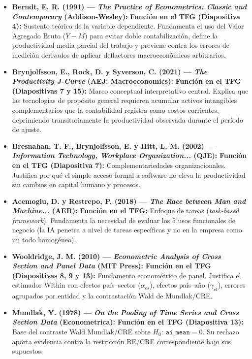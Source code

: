 \documentclass[11pt,a4paper]{article}
\begin{document}
\begin{itemize}[leftmargin=1.3em,itemsep=0.4em]
  \item \textbf{Berndt, E. R. (1991) — \textit{The Practice of Econometrics: Classic and Contemporary} (Addison-Wesley):}  
  \textbf{Función en el TFG (Diapositiva 4):} Sustento teórico de la variable dependiente. Fundamenta el uso del Valor Agregado Bruto ($Y-M$) para evitar doble contabilización, define la productividad media parcial del trabajo y previene contra los errores de medición derivados de aplicar deflactores macroeconómicos arbitrarios.

  \item \textbf{Brynjolfsson, E., Rock, D. y Syverson, C. (2021) — \textit{The Productivity J-Curve} (AEJ: Macroeconomics):}  
  \textbf{Función en el TFG (Diapositivas 7 y 15):} Marco conceptual interpretativo central. Explica que las tecnologías de propósito general requieren acumular activos intangibles complementarios que la contabilidad registra como costos corrientes, deprimiendo transitoriamente la productividad observada durante el período de ajuste.

  \item \textbf{Bresnahan, T. F., Brynjolfsson, E. y Hitt, L. M. (2002) — \textit{Information Technology, Workplace Organization...} (QJE):}  
  \textbf{Función en el TFG (Diapositiva 7):} Complementariedades organizacionales. Justifica por qué el simple acceso formal a software no eleva la productividad sin cambios en capital humano y procesos.

  \item \textbf{Acemoglu, D. y Restrepo, P. (2018) — \textit{The Race between Man and Machine...} (AER):}  
  \textbf{Función en el TFG:} Enfoque de tareas (\textit{task-based framework}). Fundamenta la necesidad de evaluar los 5 usos funcionales de negocio (la IA penetra a nivel de tareas específicas y no en la empresa como un todo homogéneo).

  \item \textbf{Wooldridge, J. M. (2010) — \textit{Econometric Analysis of Cross Section and Panel Data} (MIT Press):}  
  \textbf{Función en el TFG (Diapositivas 8, 9 y 13):} Fundamento econométrico de panel. Justifica el estimador Within con efectos país--sector ($\alpha_{cs}$), efectos país--año ($\gamma_{ct}$), errores agrupados por entidad y la contrastación Wald de Mundlak/CRE.

  \item \textbf{Mundlak, Y. (1978) — \textit{On the Pooling of Time Series and Cross Section Data} (Econometrica):}  
  \textbf{Función en el TFG (Diapositiva 13):} Base del contraste Wald Mundlak/CRE sobre $H_0:\ \texttt{ai\_mean}=0$. Su rechazo aporta evidencia contra la restricción RE/CRE correspondiente bajo sus supuestos.


\end{itemize}
\end{document}
